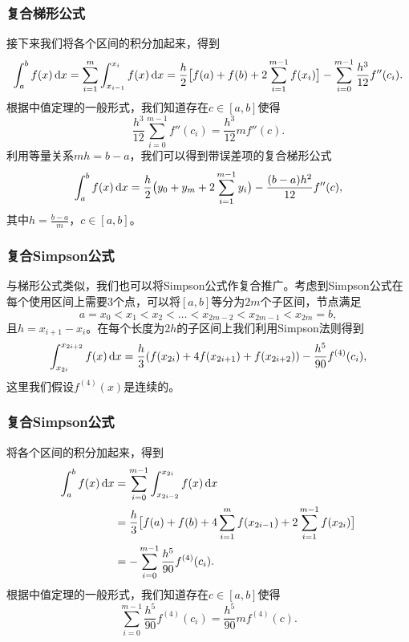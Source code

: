\documentclass[10pt]{beamer}
\def\dx{\,{\rm d}x}
\begin{document}
\begin{frame}
\frametitle{复合梯形公式}
接下来我们将各个区间的积分加起来，得到
\begin{equation}
\int_a^b f(x) \dx = \sum_{i = 1}^{m} \int_{x_{i - 1}}^{x_i} f(x) \dx = \frac{h}{2} \big[f(a) + f(b) + 2 \sum_{i = 1}^{m-1} f(x_i)  \big] - \sum_{i=0}^{m-1} \frac{h^3}{12} f''(c_i).
\end{equation}
根据中值定理的一般形式，我们知道存在$c \in [a,b]$使得
\begin{equation}
\frac{h^3}{12} \sum_{i = 0}^{m-1} f''(c_i) = \frac{h^3}{12} m f''(c).
\end{equation}
利用等量关系$mh = b-a$，我们可以得到带误差项的复合梯形公式
\begin{equation}
\int_a^bf(x) \dx = \frac{h}{2} \big( y_0 + y_m + 2\sum_{i = 1}^{m-1} y_i \big) - \frac{(b-a)h^2}{12}f''(c),
\end{equation}
其中$h = \frac{b-a}{m}$，$c \in [a,b]$。
\end{frame}


\begin{frame}
\frametitle{复合Simpson公式}
与梯形公式类似，我们也可以将Simpson公式作复合推广。考虑到Simpson公式在每个使用区间上需要3个点，可以将$[a,b]$等分为$2m$个子区间，节点满足
\begin{equation}
a = x_0 < x_1 < x_2 < \ldots < x_{2m-2} < x_{2m-1} < x_{2m} = b,
\end{equation}
且$h = x_{i+1} - x_i$。在每个长度为$2h$的子区间上我们利用Simpson法则得到
\begin{equation}
\int_{x_{2i}}^{x_{2i+2}} f(x) \dx = \frac{h}{3}( f(x_{2i}) + 4f(x_{2i+1}) + f(x_{2i+2})) - \frac{h^5}{90} f^{(4)}(c_i),
\end{equation}
这里我们假设$f^{(4)}(x)$是连续的。
\end{frame}


\begin{frame}
\frametitle{复合Simpson公式}
将各个区间的积分加起来，得到
\begin{align}
\int_a^b f(x) \dx &= \sum_{i = 0}^{m-1} \int_{x_{2i - 2}}^{x_{2i}} f(x) \dx \nonumber \\
                         &= \frac{h}{3} \big[f(a) + f(b) + 4\sum_{i =1}^m f(x_{2i-1}) + 2 \sum_{i = 1}^{m-1} f(x_{2i})  \big] \nonumber \\
                         & =- \sum_{i=0}^{m-1} \frac{h^5}{90} f^{(4)}(c_i).
\end{align}
根据中值定理的一般形式，我们知道存在$c \in [a,b]$使得
\begin{equation}
\sum_{i=0}^{m-1} \frac{h^5}{90} f^{(4)}(c_i)= \frac{h^5}{90} m f^{(4)}(c).
\end{equation}
\end{frame}
\end{document}
